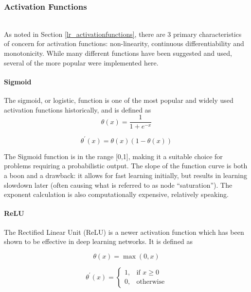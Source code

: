 \documentclass[a4paper,11pt,oneside]{article}
\theoremstyle{plain}
\theoremstyle{definition}
\begin{document}
	\subsubsection{Activation Functions}\label{imp_activation_functions}
	~\\
	As noted in Section \ref{lr_activationfunctions}, there are 3 primary characteristics of concern for activation functions: non-linearity, continuous differentiability and monotonicity. While many different functions have been suggested and used, several of the more popular were implemented here.
	
	\paragraph{Sigmoid}
	
	The sigmoid, or logistic, function is one of the most popular and widely used activation functions historically, and is defined as 
	\begin{equation}\label{func_sigmoid}
	\theta(x) = \frac{1}{1 + e^{-x}}
	\end{equation}
	
	\begin{equation}\label{func_sigmoidprime}
	\theta^\prime(x) = \theta(x)(1-\theta(x))
	\end{equation}
	
	The Sigmoid function is in the range [0,1], making it a suitable choice for problems requiring a probabilistic output. The slope of the function curve is both a boon and a drawback: it allows for fast learning initially, but results in learning slowdown later (often causing what is referred to as node ``saturation''). The exponent calculation is also computationally expensive, relatively speaking.
	
	\paragraph{ReLU}
	
	The Rectified Linear Unit (ReLU) is a newer activation function which has been shown to be effective in deep learning networks. It is defined as
	
	\begin{equation}\label{func_relu}
	\theta(x) = \max(0, x)
	\end{equation}
	
	\begin{equation}\end{equation}\label{func_relu_prime}
	\[
	\theta^\prime(x)= 
	\begin{cases}
	1,& \text{if } x\geq 0\\
	0,              & \text{otherwise}
	\end{cases}
	\]
	
\end{document}
